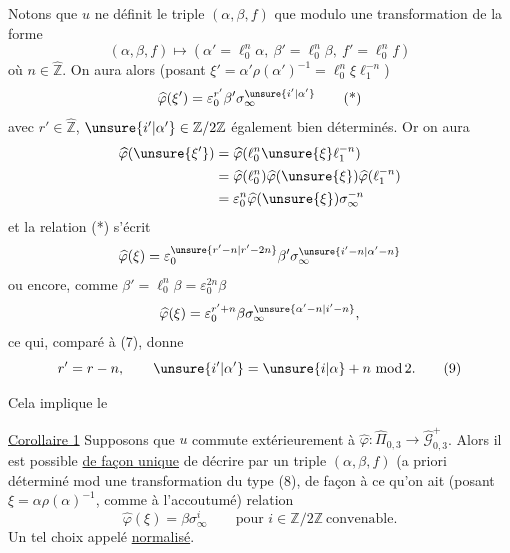 Notons que $u$ ne définit le triple $(\alpha,\beta,f)$ que modulo
une transformation de la forme
\[
(\alpha,\beta,f)\longmapsto
(\alpha'=\ell_0^n\alpha,\ \beta'=\ell_0^n\beta,\ f'=\ell_0^n f)
\tag{8}
\]
où $n\in\widehat{\mathbb Z}$. On aura alors (posant
$\xi'=\alpha'\rho(\alpha')^{-1}=\ell_0^n\xi\ell_1^{-n}$)
\[
\widehat\varphi(\xi')=\varepsilon_0^{r'}\beta'
\sigma_\infty^{\unsure{i'|\alpha'}}
\tag{*}
\]
avec $r'\in\widehat{\mathbb Z}$,
$\unsure{i'|\alpha'}\in\mathbb Z/2\mathbb Z$ également bien déterminés.
Or on aura
\[
\begin{aligned}
\widehat\varphi(\unsure{\xi'})
 &=\widehat\varphi(\ell_0^n\unsure{\xi}\ell_1^{-n})\\
 &=\widehat\varphi(\ell_0^n)\widehat\varphi(\unsure{\xi})
   \widehat\varphi(\ell_1^{-n})\\
 &=\varepsilon_0^n\widehat\varphi(\unsure{\xi})\sigma_\infty^{-n}
\end{aligned}
\]
et la relation (*) s'écrit
\[
\widehat\varphi(\xi)=\varepsilon_0^{\unsure{r'-n|r'-2n}}\beta'
\sigma_\infty^{\unsure{i'-n|\alpha'-n}}
\]
ou encore, comme $\beta'=\ell_0^n\beta=\varepsilon_0^{2n}\beta$
\[
\widehat\varphi(\xi)=\varepsilon_0^{r'+n}\beta
\sigma_\infty^{\unsure{\alpha'-n|i'-n}},
\]
ce qui, comparé à (7), donne
\[
r'=r-n,\qquad\unsure{i'|\alpha'}=\unsure{i|\alpha}+n\ \mathrm{mod}\,2.
\tag{9}
\]


Cela implique le

\uline{Corollaire 1} Supposons que $u$ commute extérieurement à
$\widehat\varphi:\widehat\Pi_{0,3}\longrightarrow
\widehat{\mathcal G}_{0,3}^{+}$. Alors il est possible
\uline{de façon unique} de décrire  par un triple
$(\alpha,\beta,f)$ (a priori déterminé mod une transformation du type (8),
de façon à ce qu'on ait (posant $\xi=\alpha\rho(\alpha)^{-1}$,
comme à l'accoutumé)  relation
\[
\boxed{\widehat\varphi(\xi)=\beta\sigma_\infty^i}
\qquad\text{pour }i\in\mathbb Z/2\mathbb Z\ \text{convenable}.
\tag{10}
\]
Un tel choix  appelé \uline{normalisé}.

